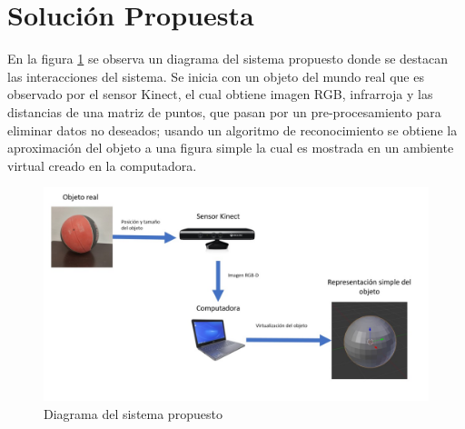 \section{Solución Propuesta}

    En la figura \ref{fig:Diagrama} se observa un diagrama del \gls{sistema} propuesto donde se destacan las interacciones del sistema. Se inicia con un objeto del mundo real que es observado por el sensor Kinect, el cual obtiene imagen RGB, infrarroja y las distancias de una matriz de puntos, que pasan por un pre-procesamiento para eliminar datos no deseados; usando un algoritmo de reconocimiento se obtiene la aproximación del objeto a una figura simple la cual es mostrada en un ambiente virtual creado en la computadora.\\
    
    
    \begin{figure}[!htb] 
        \centering
        \includegraphics[width=1\textwidth]{01Introduccion/imagenes/Diagrama_del_sistema.jpg}
        \caption{Diagrama del sistema propuesto} 
        \label{fig:Diagrama}
    \end{figure}
